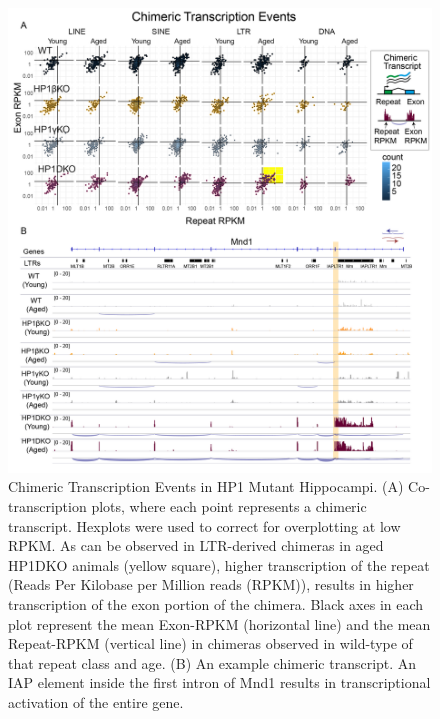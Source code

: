 \documentclass[onehalf,12pt]{beavtex}
\begin{document}
  \FloatBarrier
  
  \begin{figure}
  
  {\centering \includegraphics[width=1\linewidth, ]{./figure/results/Hexplot_thesis2} 
  
  }
  
  \caption[Chimeric Transcription Events in HP1 Mutant Hippocampi]{Chimeric Transcription Events in HP1 Mutant Hippocampi.  (A) Co-transcription plots, where each point represents a chimeric transcript. Hexplots were used to correct for overplotting at low RPKM.  As can be observed in LTR-derived chimeras in aged HP1DKO animals (yellow square), higher transcription of the repeat (Reads Per Kilobase per Million reads (RPKM)), results in higher transcription of the exon portion of the chimera.  Black axes in each plot represent the mean Exon-RPKM (horizontal line) and the mean Repeat-RPKM (vertical line) in chimeras observed in wild-type of that repeat class and age. (B) An example chimeric transcript. An IAP element inside the first intron of Mnd1 results in transcriptional activation of the entire gene.}\label{fig:chimeras}
  \end{figure}
  
  \FloatBarrier
  
\end{document}
